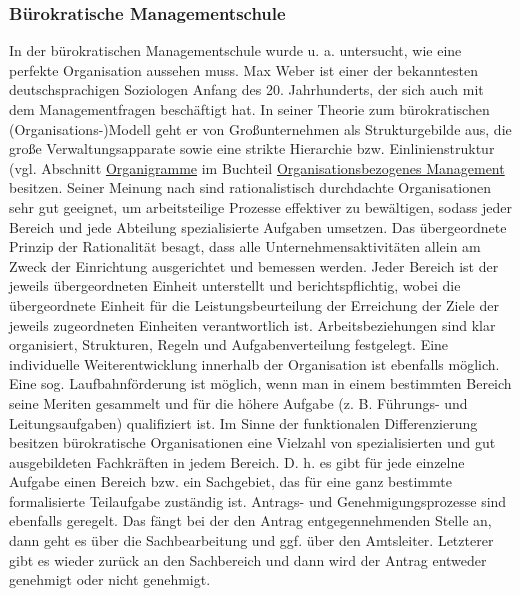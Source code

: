 \documentclass[
  letterpaper,
]{book}
\begin{document}
\subsubsection{Bürokratische
Managementschule}\label{buerokratische-managementschule}

In der bürokratischen Managementschule wurde u. a. untersucht, wie eine
perfekte Organisation aussehen muss. Max Weber ist einer der
bekanntesten deutschsprachigen Soziologen Anfang des 20. Jahrhunderts,
der sich auch mit dem Managementfragen beschäftigt hat. In seiner
Theorie zum bürokratischen (Organisations-)Modell geht er von
Großunternehmen als Strukturgebilde aus, die große Verwaltungsapparate
sowie eine strikte Hierarchie bzw. Einlinienstruktur (vgl. Abschnitt
\hyperref[organigramme]{Organigramme} im Buchteil
\hyperref[was-ist-eine-organisation]{Organisationsbezogenes Management}
besitzen. Seiner Meinung nach sind rationalistisch durchdachte
Organisationen sehr gut geeignet, um arbeitsteilige Prozesse effektiver
zu bewältigen, sodass jeder Bereich und jede Abteilung spezialisierte
Aufgaben umsetzen. Das übergeordnete Prinzip der Rationalität besagt,
dass alle Unternehmensaktivitäten allein am Zweck der Einrichtung
ausgerichtet und bemessen werden. Jeder Bereich ist der jeweils
übergeordneten Einheit unterstellt und berichtspflichtig, wobei die
übergeordnete Einheit für die Leistungsbeurteilung der Erreichung der
Ziele der jeweils zugeordneten Einheiten verantwortlich ist.
Arbeitsbeziehungen sind klar organisiert, Strukturen, Regeln und
Aufgabenverteilung festgelegt. Eine individuelle Weiterentwicklung
innerhalb der Organisation ist ebenfalls möglich. Eine sog.
Laufbahnförderung ist möglich, wenn man in einem bestimmten Bereich
seine Meriten gesammelt und für die höhere Aufgabe (z. B. Führungs- und
Leitungsaufgaben) qualifiziert ist. Im Sinne der funktionalen
Differenzierung besitzen bürokratische Organisationen eine Vielzahl von
spezialisierten und gut ausgebildeten Fachkräften in jedem Bereich. D.
h. es gibt für jede einzelne Aufgabe einen Bereich bzw. ein Sachgebiet,
das für eine ganz bestimmte formalisierte Teilaufgabe zuständig ist.
Antrags- und Genehmigungsprozesse sind ebenfalls geregelt. Das fängt bei
der den Antrag entgegennehmenden Stelle an, dann geht es über die
Sachbearbeitung und ggf. über den Amtsleiter. Letzterer gibt es wieder
zurück an den Sachbereich und dann wird der Antrag entweder genehmigt
oder nicht genehmigt.
\end{document}
